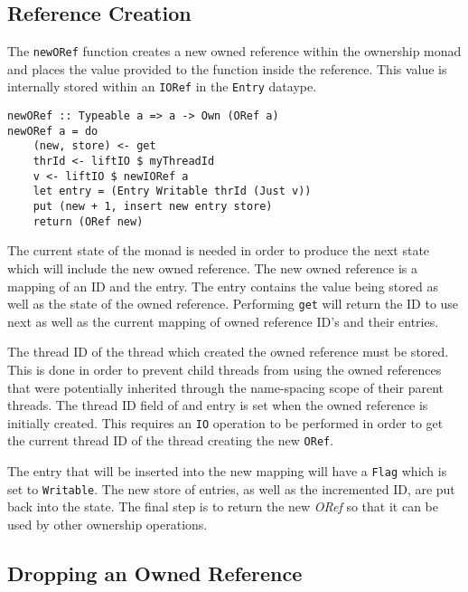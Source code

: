 \documentclass[onehalf,11pt]{beavtex}
\begin{document}
\subsection{Reference Creation}

The \texttt{newORef} function creates a new owned reference
within the ownership monad and places the value provided to the function
inside the reference. This value is internally stored within an \texttt{IORef}
in the \texttt{Entry} dataype.

\begin{verbatim}
newORef :: Typeable a => a -> Own (ORef a)
newORef a = do
    (new, store) <- get
    thrId <- liftIO $ myThreadId
    v <- liftIO $ newIORef a
    let entry = (Entry Writable thrId (Just v))
    put (new + 1, insert new entry store)
    return (ORef new)
\end{verbatim}

The current state of the monad is needed in order to produce the next state
which will include the new owned reference.
The new owned reference is a mapping of an ID and the entry. The entry
contains the value being stored as well as the state of the owned reference.
Performing \texttt{get} will return the ID to use next as well as the current
mapping of owned reference ID's and their entries.

The thread ID of the thread which created the owned reference must
be stored.  This is done in order to prevent child threads from using the owned
references that were potentially inherited through the name-spacing scope of
their parent threads.  The thread ID field of and entry is set when the owned
reference is initially created. This requires an \texttt{IO} operation to be
performed in order to get the current thread ID of the thread creating the
new \texttt{ORef}.

The entry that will be inserted into the new mapping will have a \texttt{Flag}
which is set to \texttt{Writable}.
The new store of entries, as well as the incremented ID, are put back into the
state.
The final step is to return the new \textit{ORef} so that it can be used by other
ownership operations.

\subsection{Dropping an Owned Reference}
\end{document}
